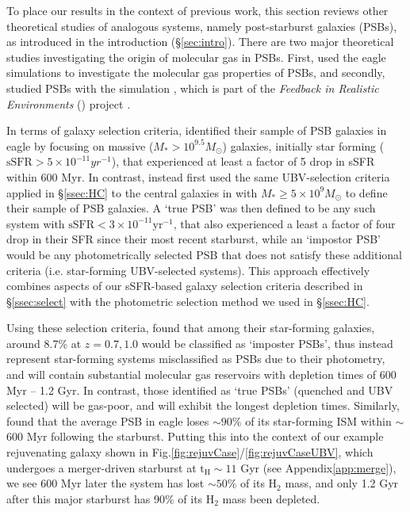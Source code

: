 \documentclass[twocolumn, linenumbers]{aastex631}
\newcommand{\hh}{\text{H}_2}
\newcommand{\ssfr}{\text{sSFR}}
\newcommand{\tH}{\text{t}_\text{H}}
\renewcommand{\fig}{Fig.\hspace{.2em}}
\newcommand{\app}{Appendix\hspace{.2em}}
\newcommand{\eagle}[0]{{\sc eagle} }
\begin{document}
To place our results in the context of previous work, this section reviews other theoretical studies of analogous systems, namely post-starburst galaxies (PSBs), as introduced in the introduction (\S\ref{sec:intro}).  There are two major theoretical studies investigating the origin of molecular gas in PSBs.  First, \cite{psbEagle} used the \eagle simulations to investigate the molecular gas properties of PSBs, and secondly, \citet{cenci25} studied PSBs with the \firebox simulation \citep{firebox}, which is part of the \textit{Feedback in Realistic Environments} (\fire) project \citep{fire, fire2}.

In terms of galaxy selection criteria, \cite{psbEagle} identified their sample of PSB galaxies in \eagle by focusing on massive ($M_*>10^{9.5}M_\odot$) galaxies, initially star forming ($\ssfr>5\times 10^{-11}yr^{-1}$), that experienced at least a factor of 5 drop in sSFR within 600 Myr.  In contrast, \cenci instead first used the same UBV-selection criteria applied in \S\ref{ssec:HC} to the central galaxies in \firebox with $M_*\ge 5\times 10^9 M_\odot$ to define their sample of PSB galaxies.  A `true PSB' was then defined to be any such system with $\text{sSFR}<3\times 10^{-11} \textrm{yr}^{-1}$, that also experienced a least a factor of four drop in their SFR since their most recent starburst, while an `impostor PSB' would be any photometrically selected PSB that does not satisfy these additional criteria (i.e. star-forming UBV-selected systems).  This approach effectively combines aspects of our sSFR-based galaxy selection criteria described in \S\ref{ssec:select} with the photometric selection method we used in \S\ref{ssec:HC}.

Using these selection criteria, \cenci found that among their star-forming galaxies, around 8.7\% at $z=0.7,1.0$ would be classified as `imposter PSBs', thus instead represent star-forming systems misclassified as PSBs due to their photometry, and will contain substantial molecular gas reservoirs with depletion times of 600 Myr -- 1.2 Gyr.  In contrast, those identified as `true PSBs' (quenched and UBV selected) will be gas-poor, and will exhibit the longest depletion times.  Similarly, \cite{psbEagle} found that the average PSB in \eagle\! loses $\sim 90\%$ of its star-forming ISM within $\sim$600 Myr following the starburst.  Putting this into the context of our example rejuvenating galaxy shown in \fig \ref{fig:rejuvCase}/\ref{fig:rejuvCaseUBV}, which undergoes a merger-driven starburst at $\tH \sim 11$ Gyr (see \app \ref{app:merge}), we see 600 Myr later the system has lost $\sim50\%$ of its $\hh$ mass, and only 1.2 Gyr after this major starburst has 90\% of its $\hh$ mass been depleted.
\end{document}
